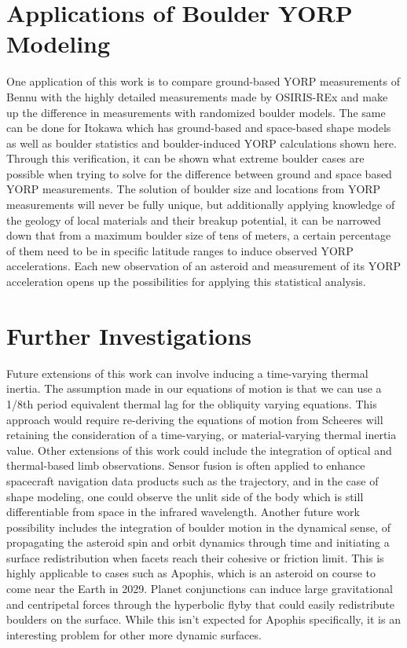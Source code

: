 \section{Applications of Boulder YORP Modeling}
One application of this work is to compare ground-based YORP measurements of Bennu with the highly detailed measurements made by OSIRIS-REx and make up the difference in measurements with randomized boulder models. The same can be done for Itokawa which has ground-based and space-based shape models as well as boulder statistics and boulder-induced YORP calculations shown here. Through this verification, it can be shown what extreme boulder cases are possible when trying to solve for the difference between ground and space based YORP measurements. The solution of boulder size and locations from YORP measurements will never be fully unique, but additionally applying knowledge of the geology of local materials and their breakup potential, it can be narrowed down that from a maximum boulder size of tens of meters, a certain percentage of them need to be in specific latitude ranges to induce observed YORP accelerations. Each new observation of an asteroid and measurement of its YORP acceleration opens up the possibilities for applying this statistical analysis.

\section{Further Investigations}
Future extensions of this work can involve inducing a time-varying thermal inertia. The assumption made in our equations of motion is that we can use a 1/8th period equivalent thermal lag for the obliquity varying equations. This approach would require re-deriving the equations of motion from Scheeres will retaining the consideration of a time-varying, or material-varying thermal inertia value.
Other extensions of this work could include the integration of optical and thermal-based limb observations. Sensor fusion is often applied to enhance spacecraft navigation data products such as the trajectory, and in the case of shape modeling, one could observe the unlit side of the body which is still differentiable from space in the infrared wavelength.
Another future work possibility includes the integration of boulder motion in the dynamical sense, of propagating the asteroid spin and orbit dynamics through time and initiating a surface redistribution when facets reach their cohesive or friction limit. This is highly applicable to cases such as Apophis, which is an asteroid on course to come near the Earth in 2029. Planet conjunctions can induce large gravitational and centripetal forces through the hyperbolic flyby that could easily redistribute boulders on the surface. While this isn't expected for Apophis specifically, it is an interesting problem for other more dynamic surfaces.

